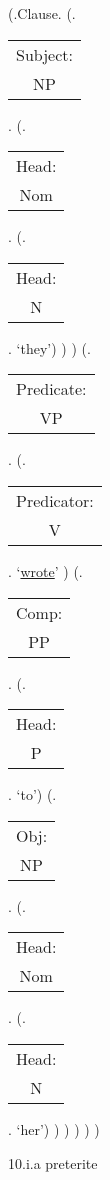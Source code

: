 \documentclass[12pt,letterpaper]{article}
\begin{document}
\begin{figure}
	\begin{center}
		\begin{parsetree}
			(.Clause.
			(.\begin{tabular}{c}Subject:\\NP\end{tabular}.  
			(.\begin{tabular}{c}Head:\\Nom\end{tabular}.
			(.\begin{tabular}{c}Head:\\N\end{tabular}. `they')
			)
			)
			(.\begin{tabular}{c}Predicate:\\VP\end{tabular}.
			(.\begin{tabular}{c}Predicator:\\V\end{tabular}. `\underline{wrote}' )
			(.\begin{tabular}{c}Comp:\\PP\end{tabular}.
			(.\begin{tabular}{c}Head:\\P\end{tabular}. `to')
			(.\begin{tabular}{c}Obj:\\NP\end{tabular}. 
			(.\begin{tabular}{c}Head:\\Nom\end{tabular}. 
			(.\begin{tabular}{c}Head:\\N\end{tabular}. `her')
			)
			)
			)
			)
			)
			
			
		\end{parsetree}
		\hfill \break \hfill \break
		10.i.a preterite
	\end{center}
\end{figure}
\end{document}
